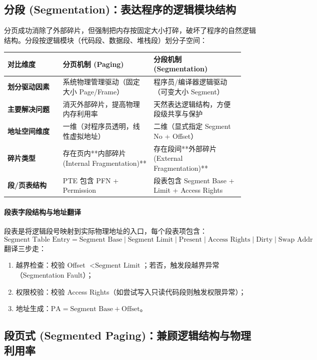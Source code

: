 \documentclass[11pt,a4paper]{ctexart}
\begin{document}
\subsection{分段 (Segmentation)：表达程序的逻辑模块结构}

分页成功消除了外部碎片，但强制把内存按固定大小打碎，破坏了程序的自然逻辑结构。分段按逻辑模块（代码段、数据段、堆栈段）划分子空间：

\begingroup
\small
\renewcommand{\arraystretch}{1.25}
\setlength{\tabcolsep}{6pt}
\begin{tabularx}{\linewidth}{>{\bfseries}p{0.22\linewidth} p{0.36\linewidth} p{0.36\linewidth}}
\toprule
对比维度 & 分页机制 (Paging) & 分段机制 (Segmentation)\\
\midrule
划分驱动因素 & 系统物理管理驱动（固定大小 Page/Frame） & 程序员/编译器逻辑驱动（可变大小 Segment）\\
主要解决问题 & 消灭外部碎片，提高物理内存利用率 & 天然表达逻辑结构，方便段级共享与保护\\
地址空间维度 & 一维（对程序员透明，线性虚拟地址） & 二维（显式指定 Segment No + Offset）\\
碎片类型 & 存在页内**内部碎片 (Internal Fragmentation)** & 存在段间**外部碎片 (External Fragmentation)**\\
段/页表结构 & PTE 包含 PFN + Permission & 段表包含 Segment Base + Limit + Access Rights\\
\bottomrule
\end{tabularx}
\endgroup

\paragraph{段表字段结构与地址翻译}
段表是将逻辑段号映射到实际物理地址的入口，每个段表项包含：
\[
\boxed{\text{Segment Table Entry} = \text{Segment Base} \mid \text{Segment Limit} \mid \text{Present} \mid \text{Access Rights} \mid \text{Dirty} \mid \text{Swap Addr}}
\]
翻译三步走：
\begin{enumerate}
  \item 越界检查：校验 Offset $< \text{Segment Limit}$；若否，触发段越界异常（Segmentation Fault）；
  \item 权限校验：校验 Access Rights（如尝试写入只读代码段则触发权限异常）；
  \item 地址生成：$\text{PA} = \text{Segment Base} + \text{Offset}$。
\end{enumerate}

\subsection{段页式 (Segmented Paging)：兼顾逻辑结构与物理利用率}
\end{document}
